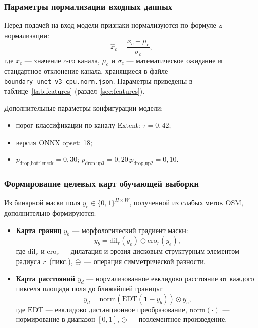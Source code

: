 \documentclass[14pt,a4paper]{extarticle}
\newcommand{\tbl}[1]{\texttt{#1}}  %
\begin{document}
\subsubsection{Параметры нормализации входных данных}
\label{sec:norm}

Перед подачей на вход модели признаки нормализуются по формуле
z-нормализации:
\begin{equation}
  \hat{x}_c = \frac{x_c - \mu_c}{\sigma_c},
  \label{eq:znorm}
\end{equation}
где $x_c$ — значение $c$-го канала, $\mu_c$ и $\sigma_c$ — математическое
ожидание и стандартное отклонение канала, хранящиеся в файле
\tbl{boundary\_unet\_v3\_cpu.norm.json}. Параметры приведены
в таблице~\ref{tab:features} (раздел~\ref{sec:features}).

Дополнительные параметры конфигурации модели:
\begin{itemize}
  \item порог классификации по каналу Extent: $\tau = 0{,}42$;
  \item версия ONNX opset: 18;
  \item $p_{\text{drop,bottleneck}} = 0{,}30$;\quad
        $p_{\text{drop,up3}} = 0{,}20$;\quad $p_{\text{drop,up2}} = 0{,}10$.
\end{itemize}

\subsubsection{Формирование целевых карт обучающей выборки}
\label{sec:targets}

Из бинарной маски поля $y_e \in \{0,1\}^{H\times W}$, полученной
из слабых меток OSM, дополнительно формируются:

\begin{itemize}
  \item \textbf{Карта границ} $y_b$ — морфологический градиент маски:
        \begin{equation}
          y_b = \text{dil}_r(y_e) \oplus \text{ero}_r(y_e),
          \label{eq:boundary_map}
        \end{equation}
        где $\text{dil}_r$ и $\text{ero}_r$ — дилатация и эрозия
        дисковым структурным элементом радиуса $r$~(пикс.), $\oplus$~—
        операция симметрической разности.

  \item \textbf{Карта расстояний} $y_d$ — нормализованное евклидово
        расстояние от каждого пикселя площади поля до ближайшей границы:
        \begin{equation}
          y_d = \text{norm}\!\left(\text{EDT}(\mathbf{1} - y_b)\right) \odot y_e,
          \label{eq:distance_map}
        \end{equation}
        где $\text{EDT}$ — евклидово дистанционное преобразование,
        $\text{norm}(\cdot)$ — нормирование в диапазон $[0, 1]$,
        $\odot$ — поэлементное произведение.
\end{itemize}
\end{document}
